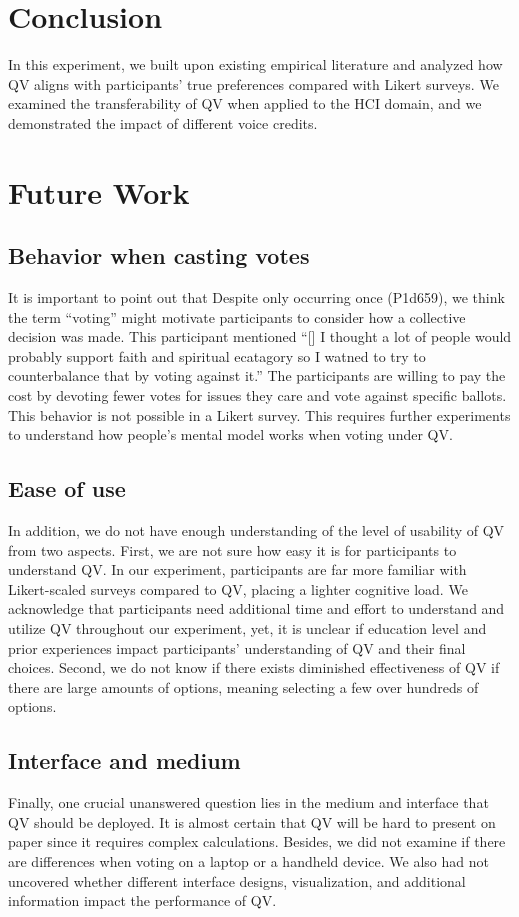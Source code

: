 \section{Conclusion} \label{conclusion}
In this experiment, we built upon existing empirical literature
and analyzed how QV aligns with participants' true preferences compared with Likert surveys.
We examined the transferability of QV when applied to the HCI domain, and we demonstrated the impact of different voice credits.


\section{Future Work} \label{future}

\subsection{Behavior when casting votes} %
It is important to point out that Despite only occurring once (P1d659), we think the term ``voting'' might motivate participants to consider how a collective decision was made.
This participant mentioned ``[\textellipsis] I thought a lot of people would probably support faith and spiritual ecatagory  so I watned to try to counterbalance that by voting against it.'' The participants are willing to pay the cost by devoting fewer votes for issues they care and vote against specific ballots. This behavior is not possible in a Likert survey. This requires further experiments to understand how people's mental model works when voting under QV. \par 

\subsection{Ease of use}
In addition, we do not have enough understanding of the level of usability of QV from two aspects.
First, we are not sure how easy it is for participants to understand QV.
In our experiment, participants are far more familiar with Likert-scaled surveys compared to QV, placing a lighter cognitive load.
We acknowledge that participants need additional time and effort to understand and utilize QV throughout our experiment, yet, it is unclear if education level and prior experiences impact participants' understanding of QV and their final choices.
Second, we do not know if there exists diminished effectiveness of QV if there are large amounts of options, meaning selecting a few over hundreds of options.

\subsection{Interface and medium}
Finally, one crucial unanswered question lies in the medium and interface that QV should be deployed.
It is almost certain that QV will be hard to present on paper since it requires complex calculations. 
Besides, we did not examine if there are differences when voting on a laptop or a handheld device.
We also had not uncovered whether different interface designs, visualization, and additional information impact the performance of QV.

